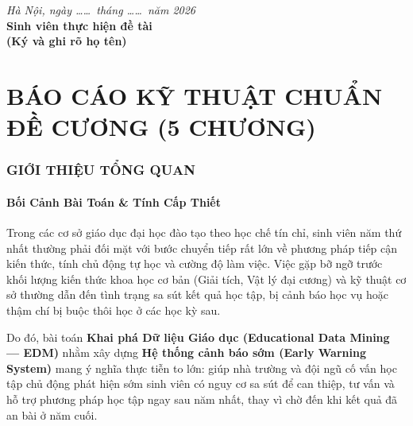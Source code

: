 \documentclass[12pt,a4paper]{article}
\begin{document}
\vspace{2cm}
\begin{flushright}
    \textit{Hà Nội, ngày \dots\dots\ tháng \dots\dots\ năm 2026}\\[0.2cm]
    \textbf{Sinh viên thực hiện đề tài}\\[2.5cm]
    \textbf{(Ký và ghi rõ họ tên)}
\end{flushright}

\newpage
\tableofcontents
\newpage
\listoftables
\listoffigures

\newpage

\part{BÁO CÁO KỸ THUẬT CHUẨN ĐỀ CƯƠNG (5 CHƯƠNG)}

\section{GIỚI THIỆU TỔNG QUAN}

\subsection{Bối Cảnh Bài Toán \& Tính Cấp Thiết}
Trong các cơ sở giáo dục đại học đào tạo theo học chế tín chỉ, sinh viên năm thứ nhất thường phải đối mặt với bước chuyển tiếp rất lớn về phương pháp tiếp cận kiến thức, tính chủ động tự học và cường độ làm việc. Việc gặp bỡ ngỡ trước khối lượng kiến thức khoa học cơ bản (Giải tích, Vật lý đại cương) và kỹ thuật cơ sở thường dẫn đến tình trạng sa sút kết quả học tập, bị cảnh báo học vụ hoặc thậm chí bị buộc thôi học ở các học kỳ sau.

Do đó, bài toán \textbf{Khai phá Dữ liệu Giáo dục (Educational Data Mining --- EDM)} nhằm xây dựng \textbf{Hệ thống cảnh báo sớm (Early Warning System)} mang ý nghĩa thực tiễn to lớn: giúp nhà trường và đội ngũ cố vấn học tập chủ động phát hiện sớm sinh viên có nguy cơ sa sút để can thiệp, tư vấn và hỗ trợ phương pháp học tập ngay sau năm nhất, thay vì chờ đến khi kết quả đã an bài ở năm cuối.
\end{document}
